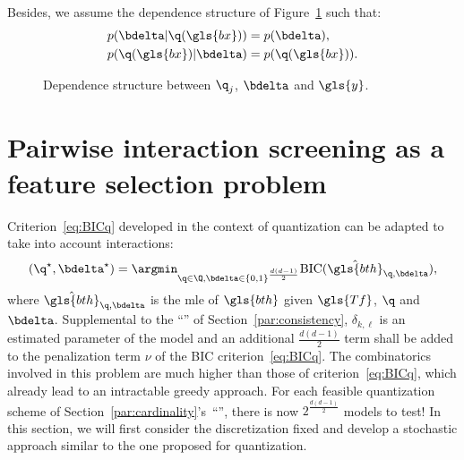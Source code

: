 Besides, we assume the dependence structure of Figure~\ref{fig:dep2} such that:
\begin{align}
p(\bdelta | \q(\gls{bx})) & = p(\bdelta), \label{indep:delta} \\
p(\q(\gls{bx}) | \bdelta) & = p(\q(\gls{bx})). \label{indep:qx}
\end{align}

\begin{figure}[!ht]
\centering
\begin{minipage}{0.45\textwidth}
\centering
{}
\caption{\label{fig:dep2}Dependence structure between $\q_j$, $\bdelta$ and $\gls{y}$.} 
\end{minipage}
\end{figure}


\section{Pairwise interaction screening as a feature selection problem} \label{sec:pairwise}

Criterion~\eqref{eq:BICq} developed in the context of quantization can be adapted to take into account interactions:
\begin{equation} \label{eq:criterion_inter}
(\q^\star,\bdelta^\star) = \argmin_{\q \in \Q, \bdelta \in \{0,1\}^{\frac{d(d-1)}{2}}} \text{BIC}(\hat{\gls{bth}}_{\q,\bdelta}),
\end{equation}
where $\hat{\gls{bth}}_{\q,\bdelta}$ is the \gls{mle} of $\gls{bth}$ given $\gls{Tf}$, $\q$ and $\bdelta$. Supplemental to the ``'' of Section~\ref{par:consistency}, $\delta_{k,\ell}$ is an estimated parameter of the model and an additional $\frac{d(d-1)}{2}$ term shall be added to the penalization term $\nu$ of the BIC criterion~\eqref{eq:BICq}. The combinatorics involved in this problem are much higher than those of criterion~\eqref{eq:BICq}, which already lead to an intractable greedy approach. For each feasible quantization scheme of Section~\ref{par:cardinality}'s~``'', there is now $2^{\frac{d(d-1)}{2}}$ models to test! In this section, we will first consider the discretization fixed and develop a stochastic approach similar to the one proposed for quantization.

